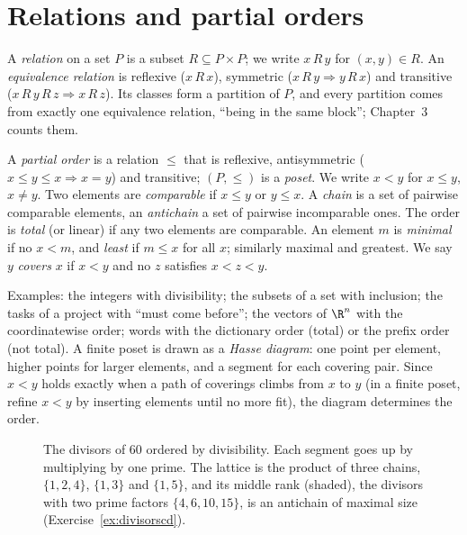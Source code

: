\section{Relations and partial orders}

A \emph{relation} on a set $P$ is a subset $R\subseteq P\times P$; we write $x\,R\,y$ for $(x,y)\in R$. An \emph{equivalence relation} is reflexive
($x\,R\,x$), symmetric ($x\,R\,y\Rightarrow y\,R\,x$) and transitive ($x\,R\,y\,R\,z\Rightarrow x\,R\,z$). Its classes form a partition of $P$, and every partition
comes from exactly one equivalence relation, ``being in the same block''; Chapter~3 counts them.

\begin{definition}\label{def:poset}
A \emph{partial order} is a relation $\le$ that is reflexive, antisymmetric ($x\le y\le x\Rightarrow x=y$) and transitive; $(P,\le)$ is a
\emph{poset}. We write $x<y$ for $x\le y$, $x\ne y$. Two elements are \emph{comparable} if $x\le y$ or $y\le x$. A \emph{chain} is a set of pairwise
comparable elements, an \emph{antichain} a set of pairwise incomparable ones. The order is \emph{total} (or linear) if any two
elements are comparable. An element $m$ is \emph{minimal} if no $x<m$, and \emph{least} if $m\le x$ for all $x$; similarly maximal and
greatest. We say $y$ \emph{covers} $x$ if $x<y$ and no $z$ satisfies $x<z<y$.
\end{definition}

Examples: the integers with divisibility; the subsets of a set with inclusion; the tasks of a project with ``must come
before''; the vectors of $\R^n$ with the coordinatewise order; words with the dictionary order (total) or the prefix order
(not total). A finite poset is drawn as a \emph{Hasse diagram}: one point per element, higher points for larger elements, and
a segment for each covering pair. Since $x<y$ holds exactly when a path of coverings climbs from $x$ to $y$ (in a finite poset,
refine $x<y$ by inserting elements until no more fit), the diagram determines the order.

\begin{figure}[ht]
\centering
{}
\caption{The divisors of $60$ ordered by divisibility. Each segment goes up by multiplying by one prime. The lattice is the
product of three chains, $\{1,2,4\}$, $\{1,3\}$ and $\{1,5\}$, and its middle rank (shaded), the divisors with two prime factors $\{4,6,10,15\}$, is an antichain of maximal size
(Exercise~\ref{ex:divisorscd}).}
\label{fig:divisors}
\end{figure}

